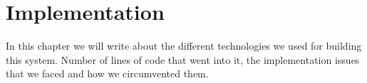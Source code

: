 
\chapter{Implementation}


In this chapter we will write about the different technologies we used for building this
system. Number of lines of code that went into it, the implementation issues that we faced
and how we circumvented them.